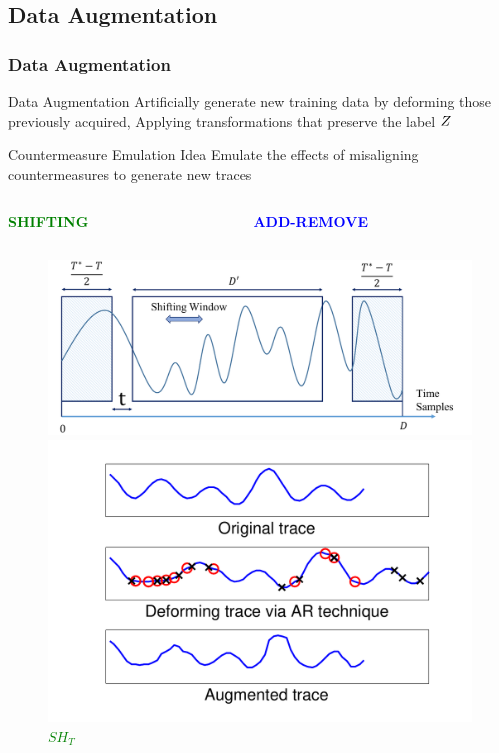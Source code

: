 \subsection{Data Augmentation}
\begin{frame}
\frametitle{Data Augmentation}
\vspace{-11pt}
\begin{block}{Data Augmentation}
Artificially generate new training data by deforming those previously acquired,
Applying transformations that preserve the label $Z$
\end{block}
\vspace{-5pt}
\begin{block}{Countermeasure Emulation Idea}
Emulate the effects of misaligning countermeasures to generate new traces
\begin{columns}
\begin{column}{0.35\textwidth}
\begin{large}
\textbf{\textcolor{green}{SHIFTING}}
\vspace{-8pt}
\end{large}
\end{column}
\begin{column}{0.35\textwidth}
\begin{large}
\textbf{\textcolor{blue}{ADD-REMOVE}}
\vspace{-8pt}
\end{large}
\end{column}
\end{columns}
\begin{figure}
  \begin{minipage}[b]{0.5\linewidth}
    \centering
    \includegraphics[width=\linewidth]{../Figures/CHES2017/Shifting_window.pdf} 
    \caption{\textcolor{green}{$SH_T$}}
  \end{minipage}%
  \begin{minipage}[b]{0.5\linewidth}
    \centering
    \includegraphics[width=.7\linewidth]{../Figures/CHES2017/AR_example.pdf} 

\end{minipage}
\end{figure}
\end{block}
\end{frame}
